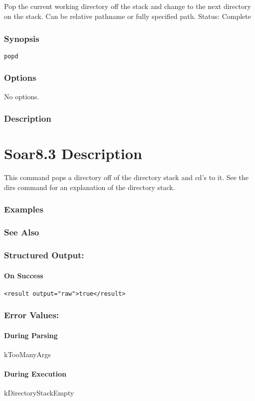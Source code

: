 \subsection{}
\label{popd}
Pop the current working directory off the stack and change to the next directory on the stack. Can be relative pathname or fully specified path. 
 Status: Complete
\subsubsection*{Synopsis}
\begin{verbatim}
popd
\end{verbatim}
\subsubsection*{Options}
 No options. 
\subsubsection*{Description}
\section*{ Soar8.3 Description }
 This command pops a directory off of the directory stack and cd's to it. See the dirs command for an explanation of the directory stack. 
\subsubsection*{Examples}
\subsubsection*{See Also}
\subsubsection*{Structured Output:}
\paragraph*{On Success}
\begin{verbatim}
<result output="raw">true</result>
\end{verbatim}
\subsubsection*{Error Values:}
\paragraph*{During Parsing}
 kTooManyArgs
\paragraph*{During Execution}
 kDirectoryStackEmpty
